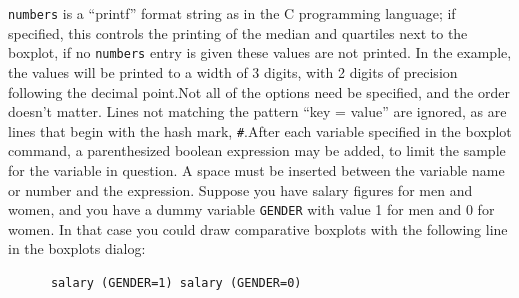 	\verb+numbers+ is a ``printf'' format
	string as in the C programming language; if specified, this
	controls the printing of the median and quartiles next to the
	boxplot, if no \verb+numbers+ entry is given these
	values are not printed.  In the example, the values will be
	printed to a width of 3 digits, with 2 digits of precision
	following the decimal point.Not all of the options need be specified, and the order
	doesn't matter.  Lines not matching the pattern ``key =
	  value'' are ignored, as are lines that begin with the
	hash mark, \verb+#+.After each variable specified in the boxplot command, a
	parenthesized boolean expression may be added, to limit the
	sample for the variable in question.  A space must be inserted
	between the variable name or number and the expression.
	Suppose you have salary figures for men and women, and you
	have a dummy variable \verb+GENDER+ with value 1
	for men and 0 for women.  In that case you could draw
	comparative boxplots with the following line in the boxplots
	dialog:
\begin{verbatim}
      salary (GENDER=1) salary (GENDER=0)
      \end{verbatim}


